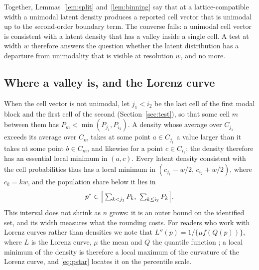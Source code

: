 Together, Lemmas~\ref{lem:split} and~\ref{lem:binning} say that at a lattice-compatible width a unimodal latent density produces a reported cell vector that is unimodal up to the second-order boundary term. The converse fails: a unimodal cell vector is consistent with a latent density that has a valley inside a single cell. A test at width $w$ therefore answers the question whether the latent distribution has a departure from unimodality that is visible at resolution $w$, and no more.

\subsection{Where a valley is, and the Lorenz curve}

When the cell vector is not unimodal, let $j_1<i_2$ be the last cell of the first modal block and the first cell of the second (Section~\ref{sec:test}), so that some cell $m$ between them has $P_m<\min(P_{j_1},P_{i_2})$. A density whose average over $C_{j_1}$ exceeds its average over $C_m$ takes at some point $a\in C_{j_1}$ a value larger than it takes at some point $b\in C_m$, and likewise for a point $c\in C_{i_2}$; the density therefore has an essential local minimum in $(a,c)$. Every latent density consistent with the cell probabilities thus has a local minimum in $(c_{j_1}-w/2,\,c_{i_2}+w/2)$, where $c_k=kw$, and the population share below it lies in
\begin{equation}\label{eq:pstar}
p^\ast\in\Bigl[\,\textstyle\sum_{k<j_1}P_k,\ \sum_{k\le i_2}P_k\Bigr].
\end{equation}
This interval does not shrink as $n$ grows: it is an outer bound on the identified set, and its width measures what the rounding costs. For readers who work with Lorenz curves rather than densities we note that $L''(p)=1/\{\mu f(Q(p))\}$, where $L$ is the Lorenz curve, $\mu$ the mean and $Q$ the quantile function \citep{Parzen1979}; a local minimum of the density is therefore a local maximum of the curvature of the Lorenz curve, and \eqref{eq:pstar} locates it on the percentile scale.
